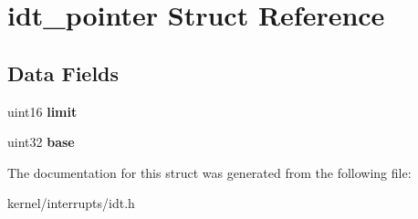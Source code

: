 \hypertarget{structidt__pointer}{
\section{idt\_\-pointer Struct Reference}
\label{structidt__pointer}
}
\subsection*{Data Fields}
\begin{DoxyCompactItemize}
\item 
\hypertarget{structidt__pointer_ac3d9a0e4ec6433ca7d5d845dd196671d}{
uint16 {\bfseries limit}}
\label{structidt__pointer_ac3d9a0e4ec6433ca7d5d845dd196671d}

\item 
\hypertarget{structidt__pointer_ae2b6ecb335ca6fe23939c8480c5baaf3}{
uint32 {\bfseries base}}
\label{structidt__pointer_ae2b6ecb335ca6fe23939c8480c5baaf3}

\end{DoxyCompactItemize}


The documentation for this struct was generated from the following file:\begin{DoxyCompactItemize}
\item 
kernel/interrupts/idt.h\end{DoxyCompactItemize}
